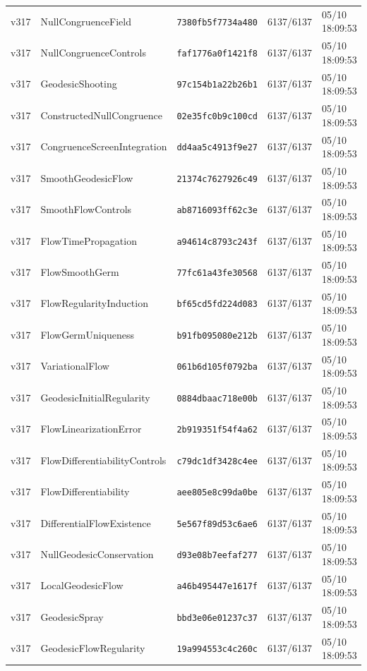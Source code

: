 \documentclass[11pt]{article}
\theoremstyle{definition}\newtheorem{deriv}{Derivação}
\begin{document}
{\begin{longtable}{@{}lllll@{}}
v317 & NullCongruenceField & \texttt{7380fb5f7734a480} & 6137/6137 & 05/10 18:09:53 \\
v317 & NullCongruenceControls & \texttt{faf1776a0f1421f8} & 6137/6137 & 05/10 18:09:53 \\
v317 & GeodesicShooting & \texttt{97c154b1a22b26b1} & 6137/6137 & 05/10 18:09:53 \\
v317 & ConstructedNullCongruence & \texttt{02e35fc0b9c100cd} & 6137/6137 & 05/10 18:09:53 \\
v317 & CongruenceScreenIntegration & \texttt{dd4aa5c4913f9e27} & 6137/6137 & 05/10 18:09:53 \\
v317 & SmoothGeodesicFlow & \texttt{21374c7627926c49} & 6137/6137 & 05/10 18:09:53 \\
v317 & SmoothFlowControls & \texttt{ab8716093ff62c3e} & 6137/6137 & 05/10 18:09:53 \\
v317 & FlowTimePropagation & \texttt{a94614c8793c243f} & 6137/6137 & 05/10 18:09:53 \\
v317 & FlowSmoothGerm & \texttt{77fc61a43fe30568} & 6137/6137 & 05/10 18:09:53 \\
v317 & FlowRegularityInduction & \texttt{bf65cd5fd224d083} & 6137/6137 & 05/10 18:09:53 \\
v317 & FlowGermUniqueness & \texttt{b91fb095080e212b} & 6137/6137 & 05/10 18:09:53 \\
v317 & VariationalFlow & \texttt{061b6d105f0792ba} & 6137/6137 & 05/10 18:09:53 \\
v317 & GeodesicInitialRegularity & \texttt{0884dbaac718e00b} & 6137/6137 & 05/10 18:09:53 \\
v317 & FlowLinearizationError & \texttt{2b919351f54f4a62} & 6137/6137 & 05/10 18:09:53 \\
v317 & FlowDifferentiabilityControls & \texttt{c79dc1df3428c4ee} & 6137/6137 & 05/10 18:09:53 \\
v317 & FlowDifferentiability & \texttt{aee805e8c99da0be} & 6137/6137 & 05/10 18:09:53 \\
v317 & DifferentialFlowExistence & \texttt{5e567f89d53c6ae6} & 6137/6137 & 05/10 18:09:53 \\
v317 & NullGeodesicConservation & \texttt{d93e08b7eefaf277} & 6137/6137 & 05/10 18:09:53 \\
v317 & LocalGeodesicFlow & \texttt{a46b495447e1617f} & 6137/6137 & 05/10 18:09:53 \\
v317 & GeodesicSpray & \texttt{bbd3e06e01237c37} & 6137/6137 & 05/10 18:09:53 \\
v317 & GeodesicFlowRegularity & \texttt{19a994553c4c260c} & 6137/6137 & 05/10 18:09:53 \\

\end{longtable}}
\end{document}
